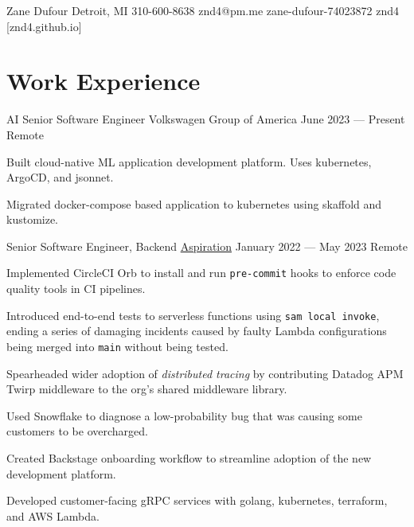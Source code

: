 \documentclass[letterpaper]{resume_config}
\newcommand{\code}[1]{\colorbox{light-gray}{\texttt{#1}}}
\begin{document}
\Header
    {Zane Dufour} %
    {Detroit, MI} %
    {310-600-8638} %
    {znd4@pm.me} %
    {zane-dufour-74023872} %
    {znd4} %
    [znd4.github.io] %


\section{Work Experience}

\WorkExperience
    {AI Senior Software Engineer} %
    {Volkswagen Group of America} %
    {June 2023 --- Present} %
    {Remote} %
    {
        \item Built cloud-native ML application development platform. Uses kubernetes, ArgoCD, and jsonnet.
        \item Migrated docker-compose based application to kubernetes using skaffold and kustomize.
    } 

\WorkExperience
    {Senior Software Engineer, Backend} %
    {\href{https://www.aspiration.com/}{Aspiration}} %
    {January 2022 --- May 2023} %
    {Remote} %
    {
        \item Implemented CircleCI Orb to install and run \code{pre-commit} hooks to enforce code quality tools in CI pipelines.
        \item Introduced end-to-end tests to serverless functions using \code{sam local invoke}, ending a series of damaging incidents caused by faulty Lambda configurations being merged into \code{main} without being tested.
        \item Spearheaded wider adoption of \textit{distributed tracing} by contributing Datadog APM Twirp middleware to the org's shared middleware library.
        \item Used Snowflake to diagnose a low-probability bug that was causing some customers to be overcharged.
        \item Created Backstage onboarding workflow to streamline adoption of the new development platform.
        \item Developed customer-facing gRPC services with golang, kubernetes, terraform, and AWS Lambda.
    }
\end{document}
